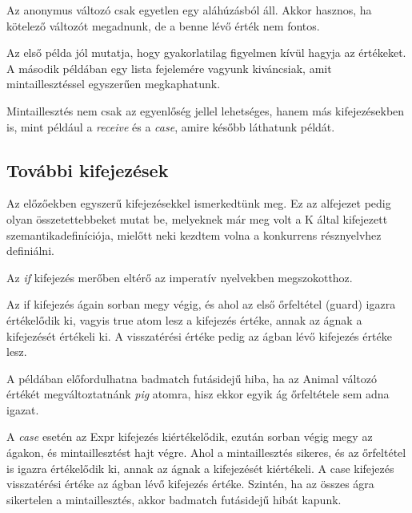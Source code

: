 Az anonymus változó csak egyetlen egy aláhúzásból áll. Akkor hasznos, ha kötelező változót megadnunk, de a benne lévő érték nem fontos.



Az első példa jól mutatja, hogy gyakorlatilag figyelmen kívül hagyja az értékeket. A második példában egy lista fejelemére vagyunk kiváncsiak, amit mintaillesztéssel egyszerűen megkaphatunk.

Mintaillesztés nem csak az egyenlőség jellel lehetséges, hanem más kifejezésekben is, mint például a \textit{receive} és a \textit{case}, amire később láthatunk példát.

\subsection{További kifejezések}

Az előzőekben egyszerű kifejezésekkel ismerkedtünk meg. Ez az alfejezet pedig olyan összetettebbeket mutat be, melyeknek már meg volt a K által kifejezett szemantikadefiníciója, mielőtt neki kezdtem volna a konkurrens résznyelvhez definiálni.

Az \textit{if} kifejezés merőben eltérő az imperatív nyelvekben megszokotthoz.



Az if kifejezés ágain sorban megy végig, és ahol az első őrfeltétel (guard) igazra értékelődik ki, vagyis true atom lesz a kifejezés értéke, annak az ágnak a kifejezését értékeli ki. A visszatérési értéke pedig az ágban lévő kifejezés értéke lesz.



A példában előfordulhatna badmatch futásidejű hiba, ha az Animal változó értékét megváltoztatnánk \textit{pig} atomra, hisz ekkor egyik ág őrfeltétele sem adna igazat.



A \textit{case} esetén az Expr kifejezés kiértékelődik, ezután sorban végig megy az ágakon, és mintaillesztést hajt végre. Ahol a mintaillesztés sikeres, és az őrfeltétel is igazra értékelődik ki, annak az ágnak a kifejezését kiértékeli. A case kifejezés visszatérési értéke az ágban lévő kifejezés értéke. Szintén, ha az összes ágra sikertelen a mintaillesztés, akkor badmatch futásidejű hibát kapunk.

